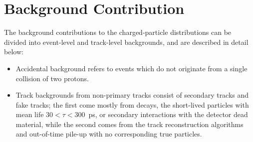 \chapter{Background Contribution}\label{section:star_background}
The background contributions to the charged-particle distributions can be divided into
event-level and track-level backgrounds, and are described in detail below:
\begin{itemize}
	\item Accidental background refers to events which do not originate from a single collision of two protons.
	\item Track backgrounds from non-primary tracks consist of secondary tracks and fake tracks; the first come mostly from decays, the short-lived particles with mean life $30 < \tau < 300$~ps, or secondary interactions with the detector dead material, while the second comes from the track reconstruction algorithms and out-of-time pile-up with
	no corresponding true particles.
\end{itemize}


